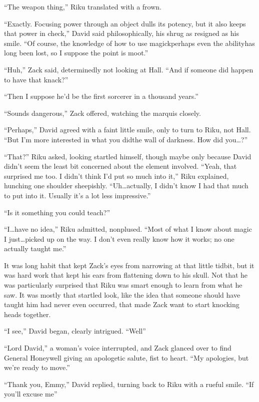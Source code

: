 ``The weapon thing,'' Riku translated with a frown.

``Exactly. Focusing power through an object dulls its potency, but it also keeps that power in check,'' David said philosophically, his shrug as resigned as his smile. ``Of course, the knowledge of how to use magick\textemdash perhaps even the ability\textemdash has long been lost, so I suppose the point is moot.''

``Huh,'' Zack said, determinedly not looking at Hall. ``And if someone did happen to have that knack?''

``Then I suppose he'd be the first sorcerer in a thousand years.''

``Sounds dangerous,'' Zack offered, watching the marquis closely.

``Perhaps,'' David agreed with a faint little smile, only to turn to Riku, not Hall. ``But I'm more interested in what you did\textemdash the wall of darkness. How did you\ldots ?''

``That?'' Riku asked, looking startled himself, though maybe only because David didn't seem the least bit concerned about the element involved. ``Yeah, that surprised me too. I didn't think I'd put so much into it,'' Riku explained, hunching one shoulder sheepishly. ``Uh\ldots actually, I didn't know I had that much to put into it. Usually it's a lot less impressive.''

``Is it something you could teach?''

``I\ldots have no idea,'' Riku admitted, nonplused. ``Most of what I know about magic I just\ldots picked up on the way. I don't even really know how it works; no one actually taught me.''

It was long habit that kept Zack's eyes from narrowing at that little tidbit, but it was hard work that kept his ears from flattening down to his skull. Not that he was particularly surprised that Riku was smart enough to learn from what he saw. It was mostly that startled look, like the idea that someone should have taught him had never even occurred, that made Zack want to start knocking heads together.

``I see,'' David began, clearly intrigued. ``Well\textemdash''

``Lord David,'' a woman's voice interrupted, and Zack glanced over to find General Honeywell giving an apologetic salute, fist to heart. ``My apologies, but we're ready to move.''

``Thank you, Emmy,'' David replied, turning back to Riku with a rueful smile. ``If you'll excuse me\textemdash''


